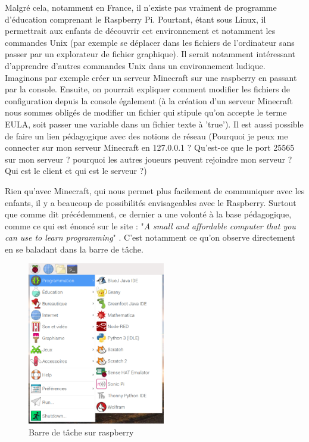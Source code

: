 Malgré cela, notamment en France, il n'existe pas vraiment de programme d'éducation comprenant le Raspberry Pi. Pourtant, étant sous Linux, il permettrait aux enfants de découvrir cet environnement et notamment les commandes Unix (par exemple se déplacer dans les fichiers de l'ordinateur sans passer par un explorateur de fichier graphique). Il serait notamment intéressant d'apprendre d'autres commandes Unix dans un environnement ludique. Imaginons par exemple créer un serveur Minecraft sur une raspberry en passant par la console. \cite{67} Ensuite, on pourrait expliquer comment modifier les fichiers de configuration depuis la console également (à la création d'un serveur Minecraft nous sommes obligés de modifier un fichier qui stipule qu'on accepte le terme EULA, soit passer une variable dans un fichier texte à 'true'). Il est aussi possible de faire un lien pédagogique avec des notions de réseau (Pourquoi je peux me connecter sur mon serveur Minecraft en 127.0.0.1 ? Qu'est-ce que le port 25565 sur mon serveur ? pourquoi les autres joueurs peuvent rejoindre mon serveur ? Qui est le client et qui est le serveur ?)

Rien qu'avec Minecraft, qui nous permet plus facilement de communiquer avec les enfants, il y a beaucoup de possibilités envisageables avec le Raspberry. Surtout que comme dit précédemment, ce dernier a une volonté à la base pédagogique, comme ce qui est énoncé sur le site : "\textit{A small and affordable computer that you can use to learn programming}" . C'est notamment ce qu'on observe directement en se baladant dans la barre de tâche.

\begin{figure}[!htb]
  \centering
  \includegraphics[width=60mm,scale=0.5]{images/raspberry.PNG}
  \caption{Barre de tâche sur raspberry}
  \label{fig:boat1}
\end{figure}

